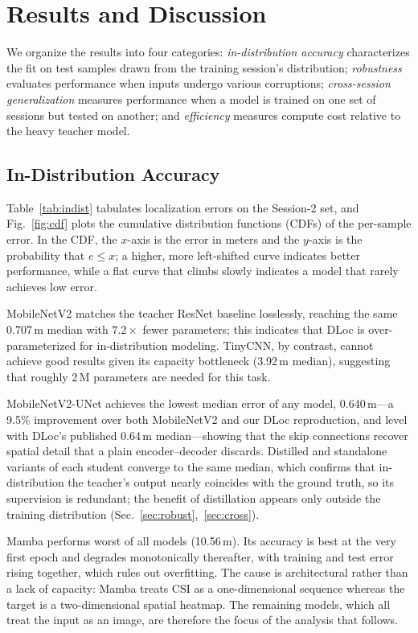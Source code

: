 \documentclass[conference]{IEEEtran}
\begin{document}
\section{Results and Discussion}
We organize the results into four categories: \emph{in-distribution accuracy} characterizes the fit on test samples drawn from the training session's distribution; \emph{robustness} evaluates performance when inputs undergo various corruptions; \emph{cross-session generalization} measures performance when a model is trained on one set of sessions but tested on another; and \emph{efficiency} measures compute cost relative to the heavy teacher model.

\subsection{In-Distribution Accuracy}
Table~\ref{tab:indist} tabulates localization errors on the Session-2 set, and Fig.~\ref{fig:cdf} plots the cumulative distribution functions (CDFs) of the per-sample error. In the CDF, the $x$-axis is the error in meters and the $y$-axis is the probability that $e \le x$; a higher, more left-shifted curve indicates better performance, while a flat curve that climbs slowly indicates a model that rarely achieves low error.

MobileNetV2 matches the teacher ResNet baseline losslessly, reaching the same 0.707\,m median with $7.2\times$ fewer parameters; this indicates that DLoc is over-parameterized for in-distribution modeling. TinyCNN, by contrast, cannot achieve good results given its capacity bottleneck (3.92\,m median), suggesting that roughly 2\,M parameters are needed for this task.

MobileNetV2-UNet achieves the lowest median error of any model, 0.640\,m---a 9.5\% improvement over both MobileNetV2 and our DLoc reproduction, and level with DLoc's published 0.64\,m median---showing that the skip connections recover spatial detail that a plain encoder--decoder discards. Distilled and standalone variants of each student converge to the same median, which confirms that in-distribution the teacher's output nearly coincides with the ground truth, so its supervision is redundant; the benefit of distillation appears only outside the training distribution (Sec.~\ref{sec:robust},~\ref{sec:cross}).

Mamba performs worst of all models (10.56\,m). Its accuracy is best at the very first epoch and degrades monotonically thereafter, with training and test error rising together, which rules out overfitting. The cause is architectural rather than a lack of capacity: Mamba treats CSI as a one-dimensional sequence whereas the target is a two-dimensional spatial heatmap. The remaining models, which all treat the input as an image, are therefore the focus of the analysis that follows.
\end{document}
